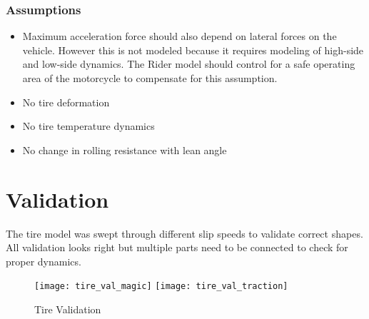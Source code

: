 \documentclass[../SimBALink.tex]{subfiles}
\begin{document}
\subsubsection{Assumptions}
\begin{itemize}
  \item Maximum acceleration force should also depend on lateral forces on the vehicle. However this is not modeled because it requires modeling of high-side and low-side dynamics. The Rider model should control for a safe operating area of the motorcycle to compensate for this assumption. 
  \item No tire deformation
  \item No tire temperature dynamics
  \item No change in rolling resistance with lean angle 
\end{itemize}

\section{Validation}

The tire model was swept through different slip speeds to validate correct shapes. All validation looks right but multiple parts need to be connected to check for proper dynamics. 

\begin{figure}[H]
\center
 \texttt{[image: tire\_val\_magic]}
 \texttt{[image: tire\_val\_traction]}
  \caption{Tire Validation}
\end{figure}
\end{document}
